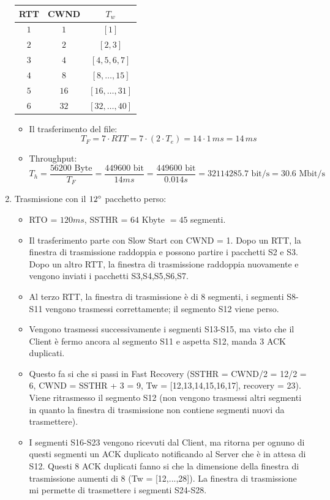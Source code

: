 \documentclass[10pt,a4paper]{article}
\newcommand{\lightrule}{%
	\arrayrulecolor{black!30}%
	\midrule[\lightrulewidth]%
	\arrayrulecolor{black}}
\begin{document}
\begin{enumerate}
\begin{center}
\begin{tabular}{@{} *{3}{c} @{}}
				\toprule
					\textbf{RTT} & \textbf{CWND} & \textbf{$T_w$} \\
				\midrule
					$1$ & $1$ & $[1]$ \\ 
				\lightrule
					$2$ & $2$ & $[2,3]$ \\
				\lightrule
					$3$ & $4$ & $[4,5,6,7]$ \\ 				
				\lightrule
					$4$ & $8$ & $[8,\dots,15]$ \\
				\lightrule
					$5$ & $16$ & $[16,\dots,31]$ \\
				\lightrule
					$6$ & $32$ & $[32,\dots,40]$ \\
				\bottomrule
			\end{tabular}
		\end{center}
		\begin{itemize}
			\item Il trasferimento del file: $$T_{F} = 7 \cdot RTT = 7 \cdot (2 \cdot T_e) = 14 \cdot 1 \,ms = 14 \,ms$$
			\item Throughput: $$T_h = \displaystyle{\frac{56200 \textrm{ Byte}}{T_F} = \frac{449600 \textrm{ bit}}{14 ms} = \frac{449600 \textrm{ bit}}{0.014 s} = 32114285.7 \textrm{ bit/s} = 30.6 \textrm{ Mbit/s}}$$
		\end{itemize}
	\newpage
	\item Trasmissione con il $12 \degree$ pacchetto perso:
	\begin{itemize}
		\item RTO = $120 ms$, SSTHR = $64$ Kbyte $= 45$ segmenti.
		\item Il trasferimento parte con Slow Start con CWND = 1. Dopo un RTT, la finestra di trasmissione raddoppia e possono partire i pacchetti S2 e S3. Dopo un altro RTT, la finestra di trasmissione raddoppia nuovamente e vengono inviati i pacchetti S3,S4,S5,S6,S7.
		\item Al terzo RTT, la finestra di trasmissione è di 8 segmenti, i segmenti S8-S11 vengono trasmessi correttamente; il segmento S12 viene perso.
		\item Vengono trasmessi successivamente i segmenti S13-S15, ma visto che il Client è fermo ancora al segmento S11 e aspetta S12, manda 3 ACK duplicati.
		\item Questo fa si che si passi in Fast Recovery (SSTHR = CWND/2 = 12/2 = 6, CWND = SSTHR + 3 = 9, Tw = [12,13,14,15,16,17], recovery = 23). Viene ritrasmesso il segmento S12 (non vengono trasmessi altri segmenti in quanto la finestra di trasmissione non contiene segmenti nuovi da trasmettere).
		\item I segmenti S16-S23 vengono ricevuti dal Client, ma ritorna per ognuno di questi segmenti un ACK duplicato notificando al Server che è in attesa di S12. Questi 8 ACK duplicati fanno si che la dimensione della finestra di trasmissione aumenti di 8 (Tw = [12,...,28]). La finestra di trasmissione mi permette di trasmettere i segmenti S24-S28.

\end{itemize}
\end{enumerate}
\end{document}
